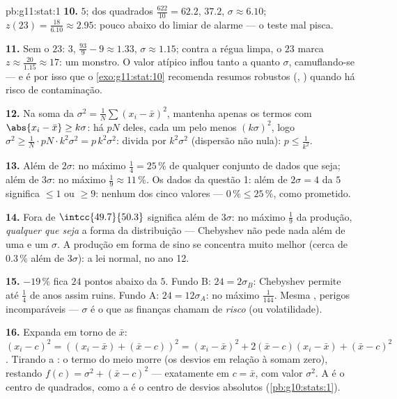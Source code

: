 \begin{solution}{pb:g11:stat:1}
\textbf{10.}  $5$;  dos quadrados
$\frac{622}{10} = 62.2$,  $37.2$,
$\sigma \approx 6.10$;
$z(23) = \frac{18}{6.10} \approx 2.95$: pouco abaixo do limiar
de alarme --- o teste mal pisca.

\textbf{11.} Sem o $23$:  $3$, 
$\frac{93}{9} - 9 \approx 1.33$, $\sigma \approx 1.15$; contra
a régua limpa, o $23$ marca
$z \approx \frac{20}{1.15} \approx 17$: um monstro. O valor
atípico inflou tanto a  quanto $\sigma$, camuflando-se ---
e é por isso que o \cref{exo:g11:stat:10} recomenda resumos
robustos (, ) quando há risco de
contaminação.

\textbf{12.} Na soma da 
$\sigma^2 = \frac1N \sum (x_i - \bar x)^2$, mantenha apenas os
termos com $\abs{x_i - \bar x} \geq k\sigma$: há $pN$ deles,
cada um pelo menos $(k\sigma)^2$, logo
$\sigma^2 \geq \frac{1}{N} \cdot pN \cdot k^2\sigma^2 =
p\,k^2\sigma^2$: divida por $k^2 \sigma^2$ (dispersão não
nula): $p \leq \frac{1}{k^2}$.

\textbf{13.} Além de $2\sigma$: no máximo $\frac14 = 25\,\%$ de
qualquer conjunto de dados que seja; além de $3\sigma$: no
máximo $\frac19 \approx 11\,\%$. Os dados da questão 1: além de
$2\sigma = 4$ da  $5$ significa $\leq 1$ ou $\geq 9$:
nenhum dos cinco valores --- $0\,\% \leq 25\,\%$, como
prometido.

\textbf{14.} Fora de $\intcc{49.7}{50.3}$ significa além de
$3\sigma$: no máximo $\frac19$ da produção,
\emph{qualquer que seja} a forma da distribuição --- Chebyshev
não pede nada além de uma  e um $\sigma$. A produção em
forma de sino se concentra muito melhor (cerca de $0.3\,\%$
além de $3\sigma$): a lei normal, no ano 12.

\textbf{15.} $-19\,\%$ fica $24$ pontos abaixo da  $5$.
Fundo B: $24 = 2\sigma_B$: Chebyshev permite até $\frac14$ de
anos assim ruins. Fundo A: $24 = 12\sigma_A$: no máximo
$\frac{1}{144}$. Mesma , perigos incomparáveis ---
$\sigma$ é o que as finanças chamam de \emph{risco} (ou
volatilidade).

\textbf{16.} Expanda em torno de $\bar x$:
$(x_i - c)^2 = \left((x_i - \bar x) + (\bar x - c)\right)^2
= (x_i - \bar x)^2 + 2(\bar x - c)(x_i - \bar x) +
(\bar x - c)^2$. Tirando a : o termo do meio morre (os
desvios em relação à  somam zero), restando
$f(c) = \sigma^2 + (\bar x - c)^2$ ---  exatamente em
$c = \bar x$, com valor  $\sigma^2$. A  é o centro
de  quadrados, como a  é o centro de 
desvios absolutos (\cref{pb:g10:stats:1}).


\end{solution}

